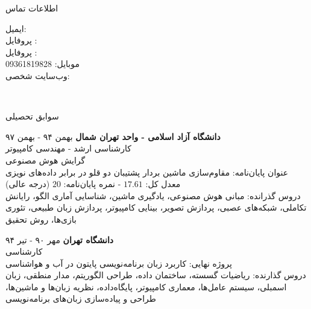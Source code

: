\documentclass{resume} %
\begin{document}



\begin{rSection}{اطلاعات تماس}
\begin{multicols}{2}
ایمیل: \\
پروفایل :  \\
پروفایل :  \\

\vfill\null
\columnbreak
موبایل: 09361819828 \\
وب‌سایت شخصی: \\
\end{multicols}
\end{rSection}
~\\[-2cm]
\begin{rSection}{سوابق تحصیلی}

{\textbf{دانشگاه آزاد اسلامی - واحد تهران شمال}} \hfill {بهمن ۹۴ - بهمن ۹۷} \\ 
کارشناسی ارشد - مهندسی کامپیوتر \\
گرایش هوش مصنوعی \smallskip \\
عنوان پایان‌نامه: مقاوم‌سازی ماشین بردار پشتیبان دو قلو در برابر داده‌های نویزی \\
معدل کل: $17.61$ - نمره پایان‌نامه: $20$ (درجه عالی) \\
دروس گذرانده: مبانی هوش مصنوعی، یادگیری ماشین، شناسایی آماری الگو، رایانش تکاملی، شبکه‌های عصبی، پردازش تصویر، بینایی کامپیوتر، پردازش زبان طبیعی، تئوری بازی‌ها، روش تحقیق


%
{\textbf{دانشگاه تهران}} \hfill {مهر ۹۰ - تیر ۹۴} \\
کارشناسی \\
پروژه نهایی: کاربرد زبان برنامه‌نویسی پایتون در آب ‌و ‌هواشناسی \\
دروس گذارنده: ریاضیات گسسته، ساختمان داده، طراحی الگوریتم، مدار منطقی، زبان اسمبلی، سیستم عامل‌ها، معماری کامپیوتر، پایگاه‌داده، نظریه زبان‌ها و ماشین‌ها، طراحی و پیاده‌سازی زبان‌های برنامه‌نویسی
\end{rSection}
\end{document}
